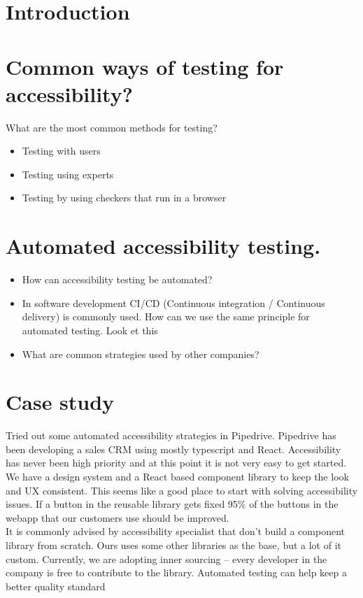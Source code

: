 \documentclass{master_thesis}
\begin{document}

\section{Introduction}


\section{Common ways of testing for accessibility?}

What are the most common methods for testing?

\begin{itemize}
	\item Testing with users
	\item Testing using experts
	\item Testing by using checkers that run in a browser
\end{itemize}

\section{Automated accessibility testing.}

\begin{itemize}
	\item How can accessibility testing be automated?
	\item In software development CI/CD (Continuous integration / Continuous delivery) is commonly used. How can we use the same principle for automated testing. Look et this \citep{Sane2021}
	\item What are common strategies used by other companies?
\end{itemize}

\section{Case study}

Tried out some automated accessibility strategies in Pipedrive. Pipedrive has been developing a sales CRM using mostly typescript and React. Accessibility has never been high priority and at this point it is not very easy to get started. We have a design system and a React based component library to keep the look and UX consistent. This seems like a good place to start with solving accessibility issues. If a button in the reusable library gets fixed 95\% of the buttons in the webapp that our customers use should be improved. \\
It is commonly advised by accessibility specialist that don't build a component library from scratch.
Ours uses some other libraries as the base, but a lot of it custom. Currently, we are adopting inner sourcing – every developer in the company is free to contribute to the library.
Automated testing can help keep a better quality standard
\end{document}
